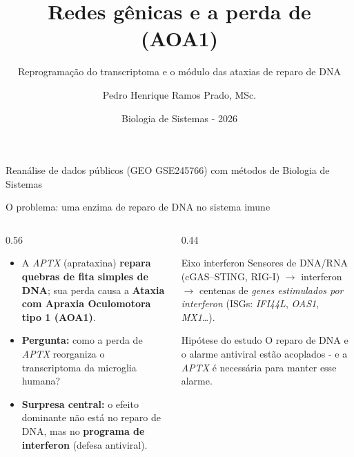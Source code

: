 \documentclass[aspectratio=169,11pt]{beamer}
\title[Redes gênicas e a perda de APTX]{Redes gênicas e a perda de \gene{APTX} (AOA1)}
\subtitle{Reprogramação do transcriptoma e o módulo das ataxias de reparo de DNA}
\author[P. H. R. Prado]{Pedro Henrique Ramos Prado, MSc.}
\institute[UFPR/PPGInf]{Programa de Pós-Graduação em Informática (PPGInf)\\Universidade Federal do Paraná}
\date{Biologia de Sistemas - 2026}
\newcommand{\gene}[1]{\textit{#1}}
\begin{document}
\begin{frame}[plain]
  \titlepage
  \begin{center}\footnotesize\textcolor{aptxblue}{Reanálise de dados públicos (GEO GSE245766) com métodos de Biologia de Sistemas}\end{center}
\end{frame}

\begin{frame}{O problema: uma enzima de reparo de DNA no sistema imune}
  \begin{columns}[T]
    \begin{column}{0.56\textwidth}
      \begin{itemize}
        \item A \gene{APTX} (aprataxina) \textbf{repara quebras de fita simples de DNA}; sua perda causa a \textbf{Ataxia com Apraxia Oculomotora tipo 1 (AOA1)}.
        \item \textbf{Pergunta:} como a perda de \gene{APTX} reorganiza o transcriptoma da microglia humana?
        \item \textbf{Surpresa central:} o efeito dominante não está no reparo de DNA, mas no \textcolor{aptxred}{\textbf{programa de interferon}} (defesa antiviral).
      \end{itemize}
    \end{column}
    \begin{column}{0.44\textwidth}
      \small
      \begin{block}{Eixo interferon}
        Sensores de DNA/RNA (cGAS--STING, RIG-I) $\rightarrow$ interferon $\rightarrow$ centenas de \emph{genes estimulados por interferon} (ISGs: \gene{IFI44L}, \gene{OAS1}, \gene{MX1}\ldots).
      \end{block}
      \begin{alertblock}{Hipótese do estudo}
        O reparo de DNA e o alarme antiviral estão acoplados - e a \gene{APTX} é necessária para manter esse alarme.
      \end{alertblock}
    \end{column}
  \end{columns}
\end{frame}
\end{document}
